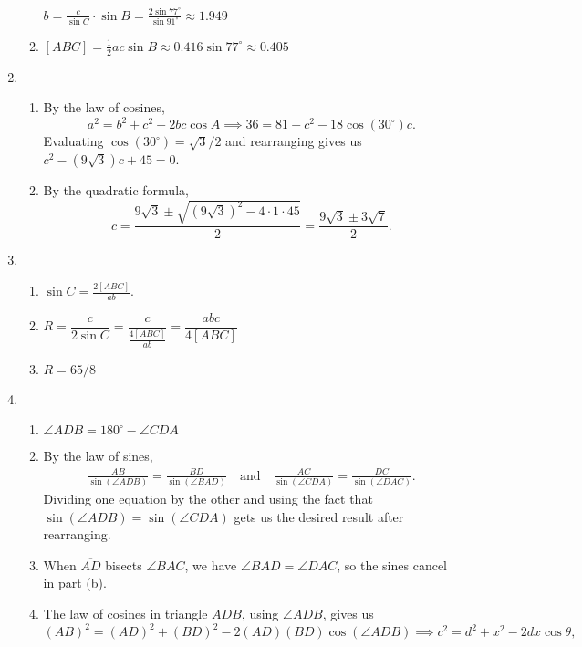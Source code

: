 \begin{enumerate}
\begin{enumerate}
$b = \frac{c}{\sin C}\cdot\sin B = \frac{2\sin 77^{\circ}}{\sin 91^{\circ}}\approx 1.949$
\item $[ABC] = \frac{1}{2}ac\sin B\approx 0.416\sin 77^{\circ}\approx 0.405$
\end{enumerate}
\item \begin{enumerate}
\item By the law of cosines,
\begin{equation*}
a^2 = b^2 + c^2 - 2bc\cos A\implies 36 = 81 + c^2 - 18\cos(30^{\circ})c.
\end{equation*}
Evaluating $\cos(30^{\circ}) = \sqrt{3}/2$ and rearranging gives us $c^2 - (9\sqrt{3})c + 45 = 0$.
\item By the quadratic formula,
\begin{equation*}
c = \frac{9\sqrt{3}\pm\sqrt{(9\sqrt{3})^2 - 4\cdot 1\cdot 45}}{2} = \frac{9\sqrt{3}\pm 3\sqrt{7}}{2}.
\end{equation*}
\end{enumerate}
\item \begin{enumerate}
\item $\sin C = \frac{2[ABC]}{ab}$.
\item $R = \dfrac{c}{2\sin C} = \dfrac{c}{\frac{4[ABC]}{ab}} = \dfrac{abc}{4[ABC]}$
\item $R = 65/8$
\end{enumerate}
\item \begin{enumerate}
\item $\angle ADB = 180^{\circ} - \angle CDA$
\item By the law of sines,
\begin{align*}
\frac{AB}{\sin(\angle ADB)} = \frac{BD}{\sin(\angle BAD)}\quad\text{and}\quad\frac{AC}{\sin(\angle CDA)} = \frac{DC}{\sin(\angle DAC)}.
\end{align*}
Dividing one equation by the other and using the fact that $\sin(\angle ADB) = \sin(\angle CDA)$ gets us the desired result after rearranging.
\item When $\overline{AD}$ bisects $\angle BAC$, we have $\angle BAD = \angle DAC$, so the sines cancel in part (b).
\item The law of cosines in triangle $ADB$, using $\angle ADB$, gives us
\begin{equation*}
(AB)^2 = (AD)^2 + (BD)^2 - 2(AD)(BD)\cos(\angle ADB)\implies c^2 = d^2 + x^2 - 2dx\cos\theta,
\end{equation*}

\end{enumerate}
\end{enumerate}

